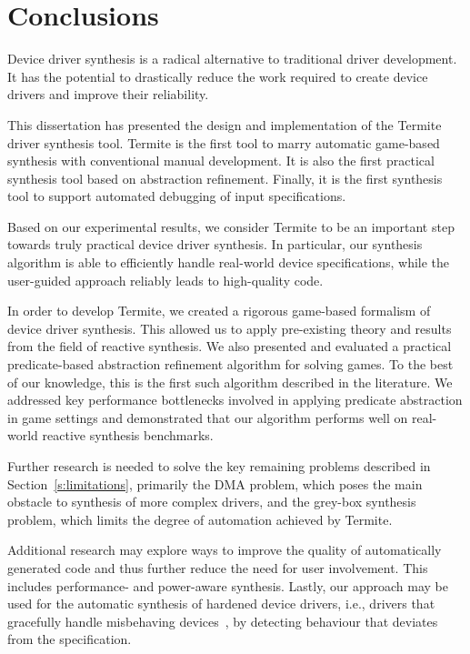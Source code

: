 \chapter{Conclusions}

Device driver synthesis is a radical alternative to traditional driver development. It has the potential to drastically reduce the work required to create device drivers and improve their reliability.

This dissertation has presented the design and implementation of the Termite driver synthesis tool. Termite is the first tool to marry automatic game-based synthesis with conventional manual development. It is also the first practical synthesis tool based on abstraction refinement. Finally, it is the first synthesis tool to support automated debugging of input specifications. 

Based on our experimental results, we consider Termite to be an important step towards truly practical device driver synthesis.  In particular, our synthesis algorithm is able to efficiently handle real-world device specifications, while the user-guided approach reliably leads to high-quality code.

In order to develop Termite, we created a rigorous game-based formalism of device driver synthesis. This allowed us to apply pre-existing theory and results from the field of reactive synthesis. We also presented and evaluated a practical predicate-based abstraction refinement algorithm for solving games. To the best of our knowledge, this is the first such algorithm described in the literature. We addressed key performance bottlenecks involved in applying predicate abstraction in game settings and demonstrated that our algorithm performs well on real-world reactive synthesis benchmarks. 

Further research is needed to solve the key remaining problems described in Section~\ref{s:limitations}, primarily the DMA problem, which poses the main obstacle to synthesis of more complex drivers, and the grey-box synthesis problem, which limits the degree of automation achieved by Termite. 

Additional research may explore ways to improve the quality of automatically generated code and thus further reduce the need for user involvement. This includes performance- and power-aware synthesis. Lastly, our approach may be used for the automatic synthesis of hardened device drivers, i.e., drivers that gracefully handle misbehaving devices~\cite{Kadav_RS_09}, by detecting behaviour that deviates from the specification.

